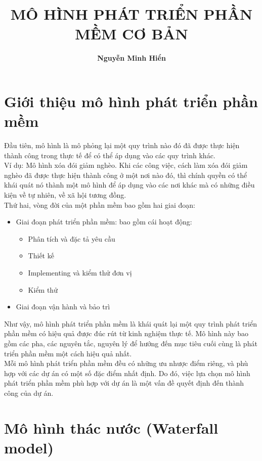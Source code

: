 \documentclass[14pt]{extarticle}
\title{\textbf{MÔ HÌNH PHÁT TRIỂN PHẦN MỀM CƠ BẢN}}
\author{\textbf{Nguyễn Minh Hiển}}
\begin{document}
\newpage
\maketitle
\tableofcontents
\newpage
\section*{Giới thiệu mô hình phát triển phần mềm}

Đầu tiên, mô hình là mô phỏng lại một quy trình nào đó đã được thực hiện thành công
trong thực tế để có thể áp dụng vào các quy trình khác.\\
Ví dụ: Mô hình xóa đói giảm nghèo. Khi các công việc, cách làm xóa đói
giảm nghèo đã được thực hiện thành công ở một nơi nào đó, thì chính quyền
có thể khái quát nó thành một mô hình để áp dụng vào các nơi khác mà có
những điều kiện về tự nhiên, về xã hội tương đồng.\\

Thứ hai, vòng đời của một phần mềm bao gồm hai giai đoạn:
\begin{itemize}
  \item Giai đoạn phát triển phần mềm: bao gồm cái hoạt động:
        \begin{itemize}
          \item Phân tích và đặc tả yêu cầu
          \item Thiết kế
          \item Implementing và kiểm thử đơn vị
          \item Kiểm thử
        \end{itemize}
  \item Giai đoạn vận hành và bảo trì
\end{itemize}

Như vậy, mô hình phát triển phần mềm là khái quát lại một quy trình phát triển
phần mềm có hiệu quả được đúc rút từ kinh nghiệm thực tế. Mô hình
này bao gồm các pha, các nguyên tắc, nguyên lý để hướng
đến mục tiêu cuối cùng là phát triển phần mềm một cách hiệu
quả nhất.\\

Mỗi mô hình phát triển phần mềm đều có những ưu nhược điểm
riêng, và phù hợp với các dự án có một số đặc điểm nhất định.
Do đó, việc lựa chọn mô hình phát triển phần mềm phù hợp với
dự án là một vấn đề quyết định đến thành công của dự án.
\newpage
\section{Mô hình thác nước (Waterfall model)} \label{sec:waterfall}
\end{document}
